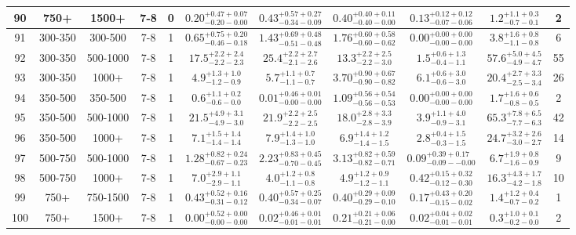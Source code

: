 \documentclass[11pt, oneside]{article}
\begin{document}
\begin{table}
{\begin{tabular}{ |c|c|c|c|c||c|c|c|c||c|c| }
90 & 750+ & 1500+ & 7-8 & 0 & $0.20^{+0.47+0.07}_{-0.20-0.00}$ & $0.43^{+0.57+0.27}_{-0.34-0.09}$ & $0.40^{+0.40+0.11}_{-0.40-0.00}$ & $0.13^{+0.12+0.12}_{-0.07-0.06}$ & $1.2^{+1.1+0.3}_{-0.7-0.1}$ & 2 \\ \hline
91 & 300-350 & 300-500 & 7-8 & 1 & $0.65^{+0.75+0.20}_{-0.46-0.18}$ & $1.43^{+0.69+0.48}_{-0.51-0.48}$ & $1.76^{+0.60+0.58}_{-0.60-0.62}$ & $0.00^{+0.00+0.00}_{-0.00-0.00}$ & $3.8^{+1.6+0.8}_{-1.1-0.8}$ & 6 \\ \hline
92 & 300-350 & 500-1000 & 7-8 & 1 & $17.5^{+2.2+2.4}_{-2.2-2.3}$ & $25.4^{+2.2+2.7}_{-2.1-2.6}$ & $13.3^{+2.2+2.5}_{-2.2-3.0}$ & $1.5^{+0.6+1.3}_{-0.4-1.1}$ & $57.6^{+5.0+4.5}_{-4.9-4.7}$ & 55 \\ \hline
93 & 300-350 & 1000+ & 7-8 & 1 & $4.9^{+1.3+1.0}_{-1.2-0.9}$ & $5.7^{+1.1+0.7}_{-1.1-0.7}$ & $3.70^{+0.90+0.67}_{-0.90-0.82}$ & $6.1^{+0.6+3.0}_{-0.6-3.0}$ & $20.4^{+2.7+3.3}_{-2.5-3.4}$ & 26 \\ \hline
94 & 350-500 & 350-500 & 7-8 & 1 & $0.6^{+1.1+0.2}_{-0.6-0.0}$ & $0.01^{+0.46+0.01}_{-0.00-0.00}$ & $1.09^{+0.56+0.54}_{-0.56-0.53}$ & $0.00^{+0.00+0.00}_{-0.00-0.00}$ & $1.7^{+1.6+0.6}_{-0.8-0.5}$ & 2 \\ \hline
95 & 350-500 & 500-1000 & 7-8 & 1 & $21.5^{+4.9+3.1}_{-4.9-3.0}$ & $21.9^{+2.2+2.5}_{-2.2-2.5}$ & $18.0^{+2.8+3.3}_{-2.8-3.9}$ & $3.9^{+1.1+4.0}_{-0.9-3.1}$ & $65.3^{+7.8+6.5}_{-7.7-6.3}$ & 42 \\ \hline
96 & 350-500 & 1000+ & 7-8 & 1 & $7.1^{+1.5+1.4}_{-1.4-1.4}$ & $7.9^{+1.4+1.0}_{-1.3-1.0}$ & $6.9^{+1.4+1.2}_{-1.4-1.5}$ & $2.8^{+0.4+1.5}_{-0.3-1.5}$ & $24.7^{+3.2+2.6}_{-3.0-2.7}$ & 14 \\ \hline
97 & 500-750 & 500-1000 & 7-8 & 1 & $1.28^{+0.82+0.24}_{-0.67-0.23}$ & $2.23^{+0.83+0.45}_{-0.70-0.45}$ & $3.13^{+0.82+0.59}_{-0.82-0.71}$ & $0.09^{+0.39+0.17}_{-0.09--0.00}$ & $6.7^{+1.9+0.8}_{-1.6-0.9}$ & 9 \\ \hline
98 & 500-750 & 1000+ & 7-8 & 1 & $7.0^{+2.9+1.1}_{-2.9-1.1}$ & $4.0^{+1.2+0.8}_{-1.1-0.8}$ & $4.9^{+1.2+0.9}_{-1.2-1.1}$ & $0.42^{+0.15+0.32}_{-0.12-0.30}$ & $16.3^{+4.3+1.7}_{-4.2-1.8}$ & 10 \\ \hline
99 & 750+ & 750-1500 & 7-8 & 1 & $0.43^{+0.52+0.16}_{-0.31-0.12}$ & $0.40^{+0.57+0.25}_{-0.34-0.07}$ & $0.40^{+0.29+0.09}_{-0.29-0.10}$ & $0.17^{+0.43+0.20}_{-0.15-0.02}$ & $1.4^{+1.2+0.4}_{-0.7-0.2}$ & 1 \\ \hline
100 & 750+ & 1500+ & 7-8 & 1 & $0.00^{+0.52+0.00}_{-0.00-0.00}$ & $0.02^{+0.46+0.01}_{-0.01-0.01}$ & $0.21^{+0.21+0.06}_{-0.21-0.00}$ & $0.02^{+0.04+0.02}_{-0.01-0.01}$ & $0.3^{+1.0+0.1}_{-0.2-0.0}$ & 2 \\ \hline

\end{tabular}}
\end{table}
\end{document}
